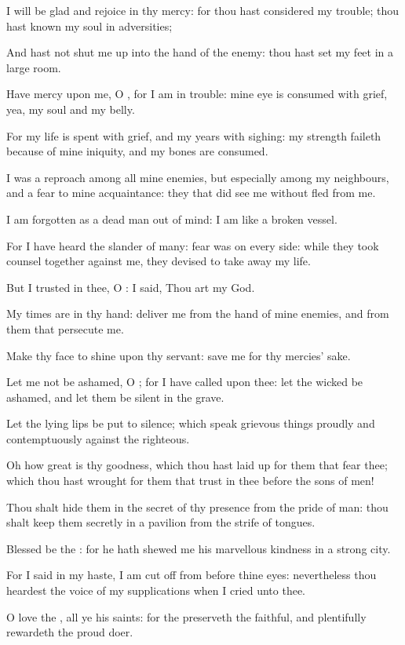 \verse I will be glad and rejoice in thy mercy: for thou hast considered my trouble; thou hast known my soul in adversities;

\verse And hast not shut me up into the hand of the enemy: thou hast set my feet in a large room.

\verse Have mercy upon me, O \LORD, for I am in trouble: mine eye is consumed with grief, yea, my soul and my belly.

\verse For my life is spent with grief, and my years with sighing: my strength faileth because of mine iniquity, and my bones are consumed.

\verse I was a reproach among all mine enemies, but especially among my neighbours, and a fear to mine acquaintance: they that did see me without fled from me.

\verse I am forgotten as a dead man out of mind: I am like a broken vessel.

\verse For I have heard the slander of many: fear was on every side: while they took counsel together against me, they devised to take away my life.

\verse But I trusted in thee, O \LORD: I said, Thou art my God.

\verse My times are in thy hand: deliver me from the hand of mine enemies, and from them that persecute me.

\verse Make thy face to shine upon thy servant: save me for thy mercies' sake.

\verse Let me not be ashamed, O \LORD; for I have called upon thee: let the wicked be ashamed, and let them be silent in the grave.

\verse Let the lying lips be put to silence; which speak grievous things proudly and contemptuously against the righteous.

\verse Oh how great is thy goodness, which thou hast laid up for them that fear thee; which thou hast wrought for them that trust in thee before the sons of men!

\verse Thou shalt hide them in the secret of thy presence from the pride of man: thou shalt keep them secretly in a pavilion from the strife of tongues.

\verse Blessed be the \LORD: for he hath shewed me his marvellous kindness in a strong city.

\verse For I said in my haste, I am cut off from before thine eyes: nevertheless thou heardest the voice of my supplications when I cried unto thee.

\verse O love the \LORD, all ye his saints: for the \LORD preserveth the faithful, and plentifully rewardeth the proud doer.


